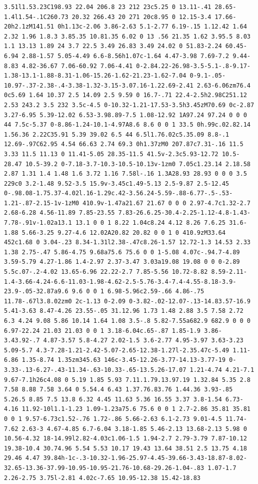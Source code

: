 \documentclass[11pt]{article}
\begin{document}
\begin{enumerate}
\begin{verbatim}
3.51l1.53.23C198.93 22.04 206.8 23 212 23c5.25 0 13.11-.41 28.65-1.4l1.54-.1C260.73 20.32 266.43 20 271 20c8.95 0 12.15-3.4 17.66-20h2.1zM141.51 0h1.13c-2.06 3.86-2.63 5.1-2.77 6.19-.15 1.12.42 1.64 2.32 1.96 1.8.3 3.85.35 10.81.35 6.02 0 13 .56 21.35 1.62 3.95.5 8.03 1.1 13.13 1.89 24 3.7 22.5 3.49 26.83 3.49 24.02 0 51.83-2.24 60.45-6.94 2.88-1.57 5.05-4.49 6.6-8.56h1.07c-1.64 4.47-3.98 7.69-7.2 9.44-8.83 4.82-36.67 7.06-60.92 7.06-4.41 0-2.84.22-26.98-3.5-5.1-.8-9.17-1.38-13.1-1.88-8.31-1.06-15.26-1.62-21.23-1.62-7.04 0-9.1-.05-10.97-.37-2.38-.4-3.38-1.32-3.15-3.07.16-1.22.69-2.41 2.63-6.06zm76.4 0c5.69 1.64 10.37 2.5 14.09 2.5 9.59 0 16.7-.71 22.4-2.5h2.98C251.12 2.53 243.2 3.5 232 3.5c-4.5 0-10.32-1.21-17.53-3.5h3.45zM70.69 0c-2.87 3.27-6.95 5.39-12.02 6.53-3.98.89-7.5 1.08-12.92 1A97.24 97.24 0 0 0 44 7.5c-5.37 0-8.86-1.24-10.1-4.97A8.6 8.6 0 0 1 33.5 0h.99c.02.82.14 1.56.36 2.22C35.91 5.39 39.02 6.5 44 6.5l1.76.02c5.35.09 8.8-.1 12.69-.97C62.95 4.54 66.63 2.74 69.3 0h1.37zM0 207.87c7.31-.16 11.5 3.33 11.5 11.13 0 11.41-5.05 28.35-11.5 41.5v-2.3c5.93-12.72 10.5-28.47 10.5-39.2 0-7.18-3.7-10.3-10.5-10.13v-1zm0 7.05c1.23.14 2.18.58 2.87 1.31 1.4 1.48 1.6 3.72 1.16 7.58l-.16 1.3A28.93 28.93 0 0 0 3.5 229c0 3.2-1.48 9.52-3.5 15.9v-3.45c1.49-5.13 2.5-9.87 2.5-12.45 0-.98.08-1.75.37-4.02l.16-1.29c.42-3.56.24-5.59-.88-6.77-.5-.53-1.21-.87-2.15-1v-1zM0 410.9v-1.47a21.67 21.67 0 0 0 2.97-4.7c1.32-2.7 2.68-6.28 4.56-11.89 7.85-23.55 7.83-26.6.25-30.4-2.25-1.12-4.8-1.43-7.78-.91v-1.02a13.1 13.1 0 0 1 8.22 1.04c8.24 4.12 8.26 7.6.25 31.6-1.88 5.66-3.25 9.27-4.6 12.02A20.82 20.82 0 0 1 0 410.9zM33.64 452c1.68 0 3.04-.23 8.34-1.31l2.38-.47c8.26-1.57 12.72-1.3 14.53 2.33 1.38 2.75-.47 5.86-4.75 9.68a75.6 75.6 0 0 1-5.08 4.07c-.94.7-4.89 3.59-5.79 4.27-1.86 1.4-2.97 2.37-3.47 3.03a19.08 19.08 0 0 0-2.89 5.5c.07-.2-4.02 13.65-6.96 22.22-2.7 7.85-5.56 10.72-8.82 8.59-2.11-1.4-3.66-4.24-6.6-11.03-1.98-4.62-2.5-5.76-3.4-7.4-4.55-8.18-3.9-23.9-.05-32.87a9.6 9.6 0 0 1 6.98-5.96c2.59-.66 4.86-.75 11.78-.67l3.8.02zm0 2c-1.13 0-2.09 0-3.82-.02-12.07-.13-14.83.57-16.9 5.41-3.63 8.47-4.26 23.55-.05 31.12.96 1.73 1.48 2.88 3.5 7.58 2.72 6.3 4.24 9.08 5.86 10.14 1.64 1.08 3.5-.8 5.82-7.55a682.9 682.9 0 0 0 6.97-22.24 21.03 21.03 0 0 1 3.18-6.04c.65-.87 1.85-1.9 3.86-3.43.92-.7 4.87-3.57 5.8-4.27 2.02-1.5 3.6-2.77 4.95-3.97 3.63-3.23 5.09-5.7 4.3-7.28-1.21-2.42-5.07-2.65-12.38-1.27l-2.35.47c-5.49 1.11-6.86 1.35-8.74 1.35zm345.63 146c-3.45-12.26-3.77-14.13-3.77-19 0-3.33-.13-6.27-.43-11.34-.63-10.33-.65-13.5.26-17.07 1.21-4.74 4.21-7.1 9.67-7.1h26c4.08 0 5.19 1.85 5.93 7.11.1.79.13.97.19 1.32.84 5.35 2.8 7.58 8.88 7.58 3.64 0 5.54.4 6.43 1.37.76.83.76 1.44.36 3.93-.85 5.26.5 8.85 7.5 13.8 6.32 4.45 11.63 5.36 16.55 3.37 3.8-1.54 6.73-4.16 11.92-10l1.1-1.23 1.09-1.23a75.6 75.6 0 0 1 2.7-2.86 35.81 35.81 0 0 1 9.57-6.73c1.52-.76 1.72-.86 5.66-2.63 6.1-2.73 9.01-4.5 11.74-7.62 2.63-3 4.67-4.85 6.7-6.04 3.18-1.85 5.46-2.13 13.68-2.13 5.98 0 10.56-4.32 18-14.99l2.82-4.03c1.06-1.5 1.94-2.7 2.79-3.79 7.87-10.12 19.38-10.4 30.74.96 5.54 5.53 10.17 19.43 13.64 38.51 2.5 13.75 4.18 29.46 4.47 39.84h-1c-.3-10.32-1.96-25.97-4.45-39.66-3.43-18.87-8.02-32.65-13.36-37.99-10.95-10.95-21.76-10.68-29.26-1.04-.83 1.07-1.7 2.26-2.75 3.75l-2.81 4.02c-7.65 10.95-12.38 15.42-18.83 
\end{verbatim}
\end{enumerate}
\end{document}
